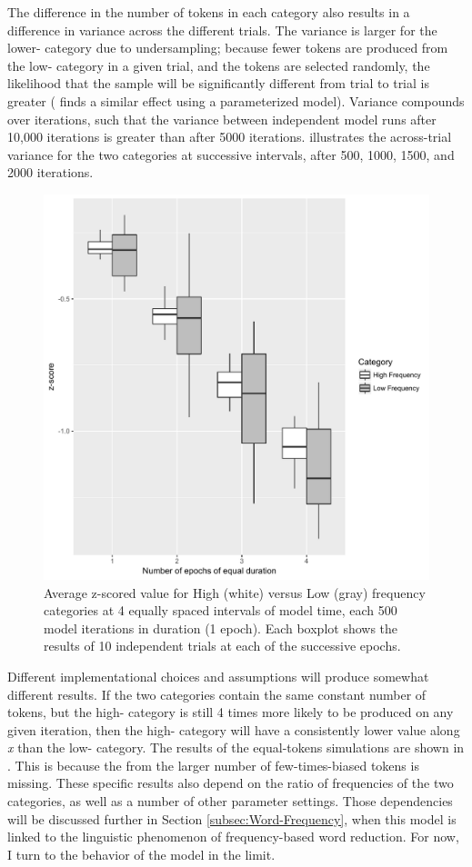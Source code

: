 The difference in the number of tokens in each category also results
in a difference in variance across the different trials. The variance
is larger for the lower- category due to undersampling; because
fewer tokens are produced from the low- category in a given
trial, and the tokens are selected randomly, the likelihood that the
sample will be significantly different from trial to trial is greater
(\citealt{Soskuthy} finds a similar effect using a parameterized 
model). Variance compounds over iterations, such that the variance
between independent model runs after 10,000 iterations is greater
than after 5000 iterations.  illustrates
the across-trial variance for the two categories at successive intervals,
after 500, 1000, 1500, and 2000 iterations.

\begin{figure}[H]
\centering{}\includegraphics[width=.75\textwidth]{figures/FrequencyOverTime.pdf}\caption{\label{fig:Frequency Catch Up}Average z-scored value for High (white)
versus Low (gray) frequency categories at 4 equally spaced intervals
of model time, each 500 model iterations in duration (1 epoch). Each boxplot shows
the results of 10 independent trials at each of the successive epochs.}
\end{figure}

Different implementational choices and assumptions will produce somewhat
different results. If the two categories contain the same constant
number of tokens, but the high- category is still 4 times
more likely to be produced on any given iteration, then the high-
category will have a consistently lower value along \emph{x} than
the low- category. The results of the equal-tokens simulations are shown in .
This is because the  from the larger number of few-times-biased
tokens is missing. These specific results also depend on the ratio
of frequencies of the two categories, as well as a number of other
parameter settings. Those dependencies will be discussed further in
Section \ref{subsec:Word-Frequency}, when this model is linked to
the linguistic phenomenon of frequency-based word reduction. For now,
I turn to the behavior of the model in the limit.


